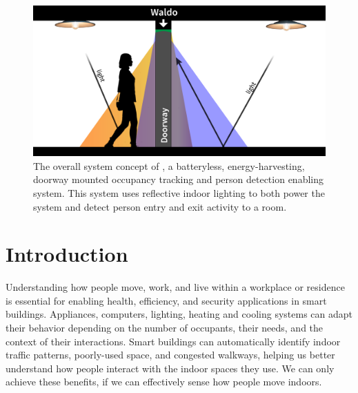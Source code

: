 \begin{figure}[t]
\centering
\includegraphics[width=\columnwidth]{figs/scenario.png}
\caption{ The overall system concept of \sysname, a batteryless, energy-harvesting, doorway mounted occupancy tracking and person detection enabling system.  This system uses reflective indoor lighting to both power the system and detect person entry and exit activity to a room.\label{fig:syspic}}
\end{figure}

\section{Introduction}
\label{sec:intro}

Understanding how people move, work, and live within a workplace or residence is essential for enabling health, efficiency, and security applications in smart buildings.
Appliances, computers, lighting, heating and cooling systems can adapt their behavior depending on the number of occupants, their needs, and the context of their interactions.
Smart buildings can automatically identify indoor traffic patterns, poorly-used space, and congested walkways, helping us better understand how people interact with the indoor spaces they use.
We can only achieve these benefits, if we can effectively sense how people move indoors.


